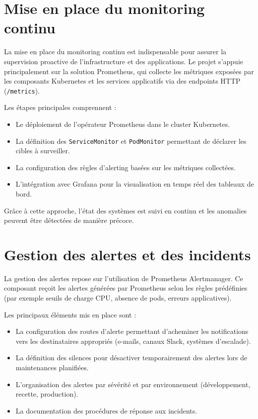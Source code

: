 \section{Mise en place du monitoring continu}

La mise en place du monitoring continu est indispensable pour assurer la supervision proactive de l’infrastructure et des applications.
Le projet s’appuie principalement sur la solution Prometheus, qui collecte les métriques exposées par les composants Kubernetes et les services applicatifs via des endpoints HTTP (\texttt{/metrics}).

Les étapes principales comprennent :
\begin{itemize}
	\item Le déploiement de l’opérateur Prometheus dans le cluster Kubernetes.
	\item La définition des \texttt{ServiceMonitor} et \texttt{PodMonitor} permettant de déclarer les cibles à surveiller.
	\item La configuration des règles d’alerting basées sur les métriques collectées.
	\item L’intégration avec Grafana pour la visualisation en temps réel des tableaux de bord.
\end{itemize}

Grâce à cette approche, l’état des systèmes est suivi en continu et les anomalies peuvent être détectées de manière précoce.

\section{Gestion des alertes et des incidents}

La gestion des alertes repose sur l’utilisation de Prometheus Alertmanager.
Ce composant reçoit les alertes générées par Prometheus selon les règles prédéfinies (par exemple seuils de charge CPU, absence de pods, erreurs applicatives).

Les principaux éléments mis en place sont :
\begin{itemize}
	\item La configuration des routes d’alerte permettant d’acheminer les notifications vers les destinataires appropriés (e-mails, canaux Slack, systèmes d’escalade).
	\item La définition des silences pour désactiver temporairement des alertes lors de maintenances planifiées.
	\item L’organisation des alertes par sévérité et par environnement (développement, recette, production).
	\item La documentation des procédures de réponse aux incidents.
\end{itemize}

